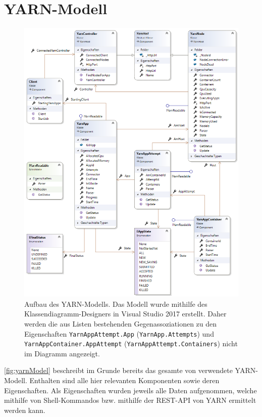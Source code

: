 \section{YARN-Modell}\label{sec:yarnModel}

\begin{figure}
	\centering
	\includegraphics[width=\columnwidth]{./images/yarnModel.png}
	\caption[Aufbau des YARN-Modells]{Aufbau des YARN-Modells. Das Modell wurde mithilfe des Klassendiagramm-Designers in Visual Studio 2017 erstellt. Daher werden die aus Listen bestehenden Gegenassoziationen zu den Eigenschaften \texttt{YarnAppAttempt.App} (\texttt{YarnApp.Attempts}) und \texttt{YarnAppContainer.AppAttempt} (\texttt{YarnAppAttempt.Containers}) nicht im Diagramm angezeigt.}
	\label{fig:yarnModel}
\end{figure}

\autoref{fig:yarnModel} beschreibt im Grunde bereits das gesamte von \sS verwendete YARN-Modell. Enthalten sind alle hier relevanten Komponenten sowie deren Eigenschaften. Als Eigenschaften wurden jeweils alle Daten aufgenommen, welche mithilfe von Shell-Kommandos bzw. mithilfe der REST-API von YARN ermittelt werden kann.

